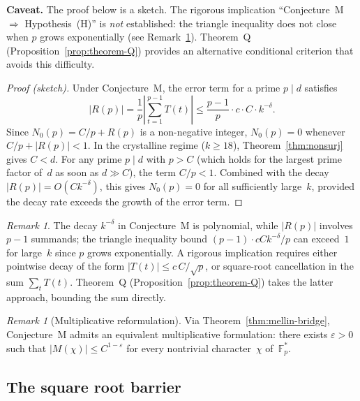 \documentclass[12pt, a4paper]{amsart}
\theoremstyle{plain}
\theoremstyle{definition}
\theoremstyle{remark}
\newtheorem{remark}[theorem]{Remark}
\newcommand{\Fp}{\mathbb{F}_p}
\begin{document}
\noindent\textbf{Caveat.}
The proof below is a sketch.  The rigorous
implication ``Conjecture~M $\Rightarrow$
Hypothesis~(H)'' is \emph{not} established: the
triangle inequality does not close when $p$ grows
exponentially (see Remark~\ref{rem:conjM-limitation}).
Theorem~Q (Proposition~\ref{prop:theorem-Q}) provides an
alternative conditional criterion that avoids this
difficulty.

\begin{proof}[Proof (sketch)]
  Under Conjecture~M, the error term for a prime
  $p \mid d$ satisfies
  \[
    |R(p)| = \frac{1}{p}\left|\sum_{t=1}^{p-1} T(t)\right|
    \leq \frac{p-1}{p}\cdot c \cdot C \cdot k^{-\delta}.
  \]
  Since $N_0(p) = C/p + R(p)$ is a non-negative integer,
  $N_0(p) = 0$ whenever $C/p + |R(p)| < 1$.
  In the crystalline regime ($k \geq 18$),
  Theorem~\ref{thm:nonsurj} gives $C < d$.
  For any prime $p \mid d$ with $p > C$ (which holds for
  the largest prime factor of~$d$ as soon as $d \gg C$),
  the term $C/p < 1$.
  Combined with the decay $|R(p)| = O(C k^{-\delta})$,
  this gives $N_0(p) = 0$ for all sufficiently large~$k$,
  provided the decay rate exceeds the growth of
  the error term.
\end{proof}

\begin{remark}\label{rem:conjM-limitation}
  The decay $k^{-\delta}$ in Conjecture~M is polynomial,
  while $|R(p)|$ involves $p - 1$ summands; the triangle
  inequality bound $(p{-}1)\cdot c C k^{-\delta}/p$ can
  exceed~$1$ for large~$k$ since $p$ grows exponentially.
  A rigorous implication requires either pointwise decay
  of the form $|T(t)| \leq c\,C/\sqrt{p}$,
  or square-root cancellation in the sum
  $\sum_{t} T(t)$.
  Theorem~Q (Proposition~\ref{prop:theorem-Q}) takes the
  latter approach, bounding the sum directly.
\end{remark}

\begin{remark}[Multiplicative reformulation]\label{rem:M-mellin}
  Via Theorem~\ref{thm:mellin-bridge}, Conjecture~M admits an
  equivalent multiplicative formulation:
  there exists $\varepsilon > 0$ such that
  $|M(\chi)| \leq C^{1-\varepsilon}$ for every nontrivial
  character~$\chi$ of~$\Fp^*$.
\end{remark}

\subsection{The square root barrier}
\end{document}

